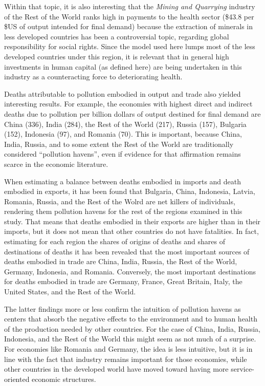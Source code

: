 \documentclass[a4paper,12pt, ]{article}
\begin{document}
Within that topic, it is also interesting that the \textit{Mining and Quarrying} industry of the Rest of the World ranks high in payments to the health sector (\$43.8 per \$US of output intended for final demand) because the extraction of minerals in less developed countries has been a controversial topic, regarding global responsibility for social rights. Since the model used here lumps most of the less developed countries under this region, it is relevant that in general high investments in human capital (as defined here) are being undertaken in this industry as a counteracting force to deteriorating health.

Deaths attributable to pollution embodied in output and trade also yielded interesting results. For example, the economies with highest direct and indirect deaths due to pollution per billion dollars of output destined for final demand are China (336), India (284), the Rest of the World (217), Russia (157), Bulgaria (152), Indonesia (97), and Romania (70). This is important, because China, India, Russia, and to some extent the Rest of the World are traditionally considered ``pollution havens'', even if evidence for that affirmation remains scarce in the economic literature.

When estimating a balance between deaths embodied in imports and death embodied in exports, it has been found that Bulgaria, China, Indonesia, Latvia, Romania, Russia, and the Rest of the Wolrd are net killers of individuals, rendering them pollution havens for the rest of the regions examined in this study. That means that deaths embodied in their exports are higher than in their imports, but it does not mean that other countries do not have fatalities. In fact, estimating for each region the shares of origins of deaths and shares of destinations of deaths it has been revealed that the most important sources of deaths embodied in trade are China, India, Russia, the Rest of the World, Germany, Indonesia, and Romania. Conversely, the most important destinations for deaths embodied in trade are Germany, France, Great Britain, Italy, the United States, and the Rest of the World.

The latter findings more or less confirm the intuition of pollution havens as centers that absorb the negative effects to the environment and to human health of the production needed by other countries. For the case of China, India, Russia, Indonesia, and the Rest of the World this might seem as not much of a surprise. For economies like Romania and Germany, the idea is less intuitive, but it is in line with the fact that industry remains important for those economies, while other countries in the developed world have moved toward having more service-oriented economic structures.
\end{document}
